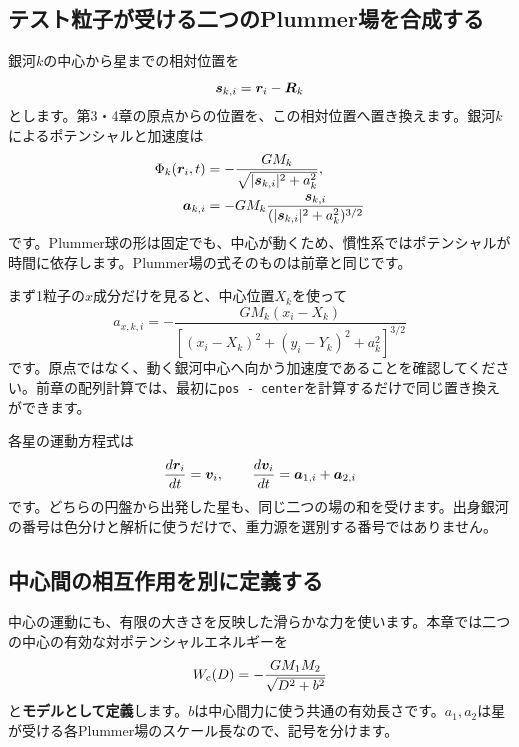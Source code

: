 \subsection{テスト粒子が受ける二つのPlummer場を合成する}
銀河$k$の中心から星までの相対位置を
\begin{equation}
\boldsymbol s_{k,i}=\boldsymbol r_i-\boldsymbol R_k
\label{eq:ch5-local-position}
\end{equation}
とします。第3・4章の原点からの位置を、この相対位置へ置き換えます。銀河$k$によるポテンシャルと加速度は
\begin{align}
\Phi_k(\boldsymbol r_i,t)&=-\frac{GM_k}{\sqrt{|\boldsymbol s_{k,i}|^2+a_k^2}},
\label{eq:ch5-moving-potential}\\
\boldsymbol a_{k,i}&=-GM_k\frac{\boldsymbol s_{k,i}}{(|\boldsymbol s_{k,i}|^2+a_k^2)^{3/2}}
\label{eq:ch5-moving-acceleration}
\end{align}
です。Plummer球の形は固定でも、中心が動くため、慣性系ではポテンシャルが時間に依存します。Plummer場の式そのものは前章と同じです。\cite{bt2008}

まず1粒子の$x$成分だけを見ると、中心位置$X_k$を使って
\begin{equation}
a_{x,k,i}=-\frac{GM_k(x_i-X_k)}{[(x_i-X_k)^2+(y_i-Y_k)^2+a_k^2]^{3/2}}
\label{eq:ch5-component}
\end{equation}
です。原点ではなく、動く銀河中心へ向かう加速度であることを確認してください。前章の配列計算では、最初に\texttt{pos - center}を計算するだけで同じ置き換えができます。

各星の運動方程式は
\begin{equation}
\frac{d\boldsymbol r_i}{dt}=\boldsymbol v_i,\qquad \frac{d\boldsymbol v_i}{dt}=\boldsymbol a_{1,i}+\boldsymbol a_{2,i}
\label{eq:ch5-tracer-ode}
\end{equation}
です。どちらの円盤から出発した星も、同じ二つの場の和を受けます。出身銀河の番号は色分けと解析に使うだけで、重力源を選別する番号ではありません。

\subsection{中心間の相互作用を別に定義する}
中心の運動にも、有限の大きさを反映した滑らかな力を使います。本章では二つの中心の有効な対ポテンシャルエネルギーを
\begin{equation}
W_{\rm c}(D)=-\frac{GM_1M_2}{\sqrt{D^2+b^2}}
\label{eq:ch5-pair-potential}
\end{equation}
と\textbf{モデルとして定義}します。$b$は中心間力に使う共通の有効長さです。$a_1,a_2$は星が受ける各Plummer場のスケール長なので、記号を分けます。

